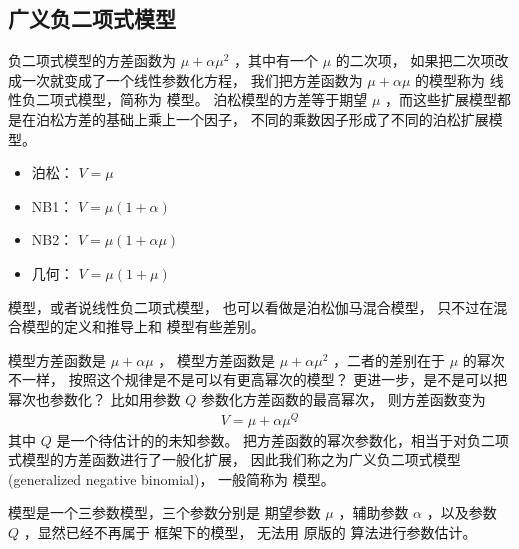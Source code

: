 \documentclass[letterpaper,10pt,english]{sphinxmanual}
\begin{document}
\subsection{广义负二项式模型}
\label{\detokenize{_u8d1f_u4e8c_u9879_u6a21_u578b/content:id12}}
负二项式模型的方差函数为 \(\mu+\alpha \mu^2\)
，其中有一个 \(\mu\) 的二次项，
如果把二次项改成一次就变成了一个线性参数化方程，
我们把方差函数为 \(\mu+ \alpha \mu\) 的模型称为
线性负二项式模型，简称为  模型。
泊松模型的方差等于期望 \(\mu\)
，而这些扩展模型都是在泊松方差的基础上乘上一个因子，
不同的乘数因子形成了不同的泊松扩展模型。
\begin{itemize}
\item {} 
泊松： \(V=\mu\)

\item {} 
NB1： \(V=\mu(1+\alpha )\)

\item {} 
NB2： \(V=\mu(1+\alpha \mu)\)

\item {} 
几何： \(V=\mu(1+\mu)\)

\end{itemize}

 模型，或者说线性负二项式模型，
也可以看做是泊松\sphinxhyphen{}伽马混合模型，
只不过在混合模型的定义和推导上和  模型有些差别。

 模型方差函数是
\(\mu+\alpha \mu\)
， 模型方差函数是
\(\mu+\alpha \mu^2\)
，二者的差别在于 \(\mu\) 的幂次不一样，
按照这个规律是不是可以有更高幂次的模型？
更进一步，是不是可以把幂次也参数化？
比如用参数 \(Q\)
参数化方差函数的最高幂次，
则方差函数变为
\begin{equation}\label{equation:负二项模型/content:负二项模型/content:28}
\begin{split}V = \mu +\alpha \mu^Q\end{split}
\end{equation}
其中 \(Q\) 是一个待估计的的未知参数。
把方差函数的幂次参数化，相当于对负二项式模型的方差函数进行了一般化扩展，
因此我们称之为广义负二项式模型(generalized negative binomial)，
一般简称为  模型。

 模型是一个三参数模型，三个参数分别是
期望参数 \(\mu\) ，辅助参数 \(\alpha\)
，以及参数 \(Q\)
，显然已经不再属于  框架下的模型，
无法用  原版的  算法进行参数估计。
\end{document}
